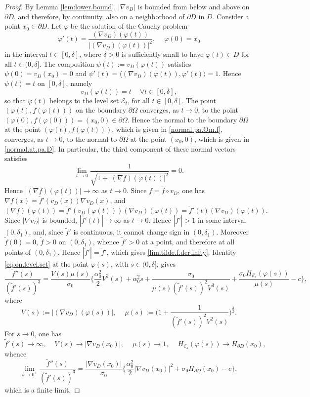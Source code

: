 \documentclass[10pt,reqno,a4paper]{article}
\numberwithin{equation}{section}
\theoremstyle{plain}
\theoremstyle{definition}
\newcommand{\mE}{\mathcal{E}}
\newcommand{\ph}{\varphi}
\newcommand{\Om}{\Omega}
\newcommand{\la}{\langle}
\newcommand{\ra}{\rangle}
\newcommand{\pa}{\partial}
\newcommand{\grad}{\nabla}
\begin{document}
\begin{proof}
By Lemma \ref{lem:lower.bound}, $|\grad v_D|$ is bounded from below and above on $\pa D$, 
and therefore, by continuity, also on a neighborhood of $\pa D$ in $D$.
Consider a point $x_0 \in \pa D$. Let $\ph$ be the solution of the Cauchy problem 
\[
\ph'(t) = \frac{ (\grad v_D)(\ph(t)) }{ |(\grad v_D)(\ph(t))|^2 }, \quad \ 
\ph(0) = x_0
\]
in the interval $t \in [0, \delta]$, where $\delta > 0$ is sufficiently small 
to have $\ph(t) \in D$ for all $t \in (0, \delta]$. 
The composition $\psi(t) := v_D(\ph(t))$ satisfies 
$\psi(0) = v_D(x_0) = 0$ 
and $\psi'(t) = \la (\grad v_D)(\ph(t)) , \ph'(t) \ra = 1$. 
Hence $\psi(t) = t$ on $[0,\delta]$, namely  
\[
v_D(\ph(t)) = t \quad \ \forall t \in [0,\delta],
\]
so that $\ph(t)$ belongs to the level set $\mE_t$, for all $t \in [0, \delta]$.  
The point $(\ph(t), f(\ph(t)))$ on the boundary $\pa \Om$ 
converges, as $t \to 0$,
to the point $(\ph(0), f(\ph(0))) = (x_0, 0) \in \pa \Om$.
Hence the normal to the boundary $\pa \Om$ at the point $(\ph(t), f(\ph(t)))$,
which is given in \eqref{normal.pa.Om.f}, converges, as $t \to 0$, 
to the normal to $\pa \Om$ at the point $(x_0,0)$, which is given in \eqref{normal.at.pa.D}. 
In particular, the third component of these normal vectors satisfies 
\[
\lim_{t \to 0} \frac{1}{\sqrt{1 + |(\grad f)(\ph(t))|^2}} = 0.
\]
Hence $|(\grad f)(\ph(t))| \to \infty$ as $t \to 0$. 
Since $f = \tilde f \circ v_D$, one has $\grad f(x) = \tilde f'(v_D(x)) \grad v_D(x)$, 
and 
\[
(\grad f)(\ph(t)) = \tilde f'(v_D(\ph(t))) (\grad v_D)(\ph(t))  
= \tilde f'(t) (\grad v_D)(\ph(t)).
\]  
Since $|\grad v_D|$ is bounded, $|\tilde f'(t)| \to \infty$ as $t \to 0$. 
Hence $|\tilde f'| > 1$ in some interval $(0, \delta_1)$, 
and, since $\tilde f'$ is continuous, %
it cannot change sign in $(0, \delta_1)$.   
Moreover $\tilde f(0) = 0$, $\tilde f > 0$ on $(0, \delta_1)$, 
whence $\tilde f' > 0$ at a point, and therefore at all points of $(0, \delta_1)$.  
Hence $|\tilde f'| = \tilde f'$, which gives \eqref{lim.tilde.f.der.infty}.
%
Identity \eqref{eq:on.level.set} at the point $\ph(s)$, with $s \in (0, \delta]$, gives 
\[
\frac{ \tilde f''(s) }{ (\tilde f'(s))^3 } 
= \frac{ V(s) \mu(s) }{ \sigma_0 }
\Big\{ \frac{\alpha_0^2}{2} V^2(s) 
+ \alpha_0^2 s 
+ \frac{ \sigma_0 }{ \mu(s) (\tilde f'(s))^2 V^3(s) }
+ \frac{ \sigma_0 H_{\mE_s}(\ph(s)) }{ \mu(s) } 
- c \Big\},
\]
where 
\[
V(s) := |(\grad v_D)(\ph(s))|, \quad \  
\mu(s) := \Big( 1 + \frac{1}{(\tilde f'(s))^2 V^2(s)} \Big)^{\frac32}.
\]
For $s \to 0$, one has 
\[
\tilde f'(s) \to \infty, \quad \ 
V(s) \to |\grad v_D(x_0)|, \quad \  
\mu(s) \to 1, \quad \ 
H_{\mE_s}(\ph(s)) \to H_{\pa D}(x_0),
\]
whence 
\begin{equation} \label{beta.direct}
\lim_{s \to 0^+} \frac{ \tilde f''(s) }{ (\tilde f'(s))^3 } 
= \frac{ |\grad v_D(x_0)| }{ \sigma_0 }
\Big\{ \frac{\alpha_0^2}{2} |\grad v_D(x_0)|^2 
+ \sigma_0 H_{\pa D}(x_0) 
- c \Big\},
\end{equation}
which is a finite limit. 
\end{proof}
\end{document}
